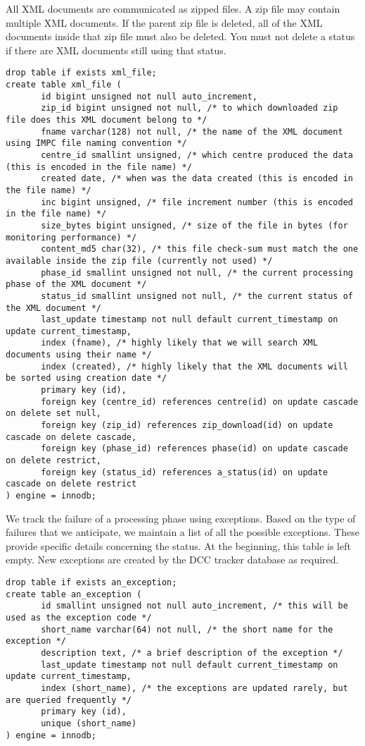 \documentclass[a4paper,11pt]{article}
\begin{document}
\begin{landscape}
All XML documents are communicated as zipped files. A zip file may contain multiple XML documents. If the parent zip file is deleted, all of the XML documents inside that zip file must also be deleted. You must not delete a status if there are XML documents still using that status.
\begin{Verbatim}[fontsize=\small,formatcom=\color{blue}]
drop table if exists xml_file;
create table xml_file (
       id bigint unsigned not null auto_increment,
       zip_id bigint unsigned not null, /* to which downloaded zip file does this XML document belong to */
       fname varchar(128) not null, /* the name of the XML document using IMPC file naming convention */
       centre_id smallint unsigned, /* which centre produced the data (this is encoded in the file name) */
       created date, /* when was the data created (this is encoded in the file name) */
       inc bigint unsigned, /* file increment number (this is encoded in the file name) */
       size_bytes bigint unsigned, /* size of the file in bytes (for monitoring performance) */
       content_md5 char(32), /* this file check-sum must match the one available inside the zip file (currently not used) */
       phase_id smallint unsigned not null, /* the current processing phase of the XML document */
       status_id smallint unsigned not null, /* the current status of the XML document */
       last_update timestamp not null default current_timestamp on update current_timestamp,
       index (fname), /* highly likely that we will search XML documents using their name */
       index (created), /* highly likely that the XML documents will be sorted using creation date */
       primary key (id),
       foreign key (centre_id) references centre(id) on update cascade on delete set null,
       foreign key (zip_id) references zip_download(id) on update cascade on delete cascade,
       foreign key (phase_id) references phase(id) on update cascade on delete restrict,
       foreign key (status_id) references a_status(id) on update cascade on delete restrict
) engine = innodb;
\end{Verbatim}

We track the failure of a processing phase using exceptions. Based on the type of failures that we anticipate, we maintain a list of all the possible exceptions. These provide specific details concerning the status. At the beginning, this table is left empty. New exceptions are created by the DCC tracker database as required.

\begin{Verbatim}[fontsize=\small,formatcom=\color{blue}]
drop table if exists an_exception;
create table an_exception (
       id smallint unsigned not null auto_increment, /* this will be used as the exception code */
       short_name varchar(64) not null, /* the short name for the exception */
       description text, /* a brief description of the exception */
       last_update timestamp not null default current_timestamp on update current_timestamp,
       index (short_name), /* the exceptions are updated rarely, but are queried frequently */
       primary key (id),
       unique (short_name)
) engine = innodb;
\end{Verbatim}


\end{landscape}
\end{document}
